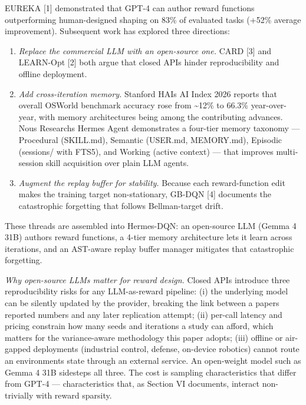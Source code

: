 \documentclass[conference,letterpaper,10pt]{IEEEtran}
\providecommand{\tightlist}{\setlength{\itemsep}{0pt}\setlength{\parskip}{0pt}}
\begin{document}
EUREKA {[}1{]} demonstrated that GPT-4 can author reward functions outperforming human-designed shaping on 83\% of evaluated tasks (+52\% average improvement). Subsequent work has explored three directions:

\begin{enumerate}
\def\labelenumi{\arabic{enumi}.}
\tightlist
\item
  \emph{Replace the commercial LLM with an open-source one.} CARD {[}3{]} and LEARN-Opt {[}2{]} both argue that closed APIs hinder reproducibility and offline deployment.
\item
  \emph{Add cross-iteration memory.} Stanford HAI\textquotesingle s AI Index 2026 reports that overall OSWorld benchmark accuracy rose from \textasciitilde12\% to 66.3\% year-over-year, with memory architectures being among the contributing advances. Nous Research\textquotesingle s Hermes Agent demonstrates a four-tier memory taxonomy --- Procedural (SKILL.md), Semantic (USER.md, MEMORY.md), Episodic (sessions/ with FTS5), and Working (active context) --- that improves multi-session skill acquisition over plain LLM agents.
\item
  \emph{Augment the replay buffer for stability.} Because each reward-function edit makes the training target non-stationary, GB-DQN {[}4{]} documents the catastrophic forgetting that follows Bellman-target drift.
\end{enumerate}

These threads are assembled into Hermes-DQN: an open-source LLM (Gemma 4 31B) authors reward functions, a 4-tier memory architecture lets it learn across iterations, and an AST-aware replay buffer manager mitigates that catastrophic forgetting.

\emph{Why open-source LLMs matter for reward design.} Closed APIs introduce three reproducibility risks for any LLM-as-reward pipeline: (i) the underlying model can be silently updated by the provider, breaking the link between a paper\textquotesingle s reported numbers and any later replication attempt; (ii) per-call latency and pricing constrain how many seeds and iterations a study can afford, which matters for the variance-aware methodology this paper adopts; (iii) offline or air-gapped deployments (industrial control, defense, on-device robotics) cannot route an environment\textquotesingle s state through an external service. An open-weight model such as Gemma 4 31B sidesteps all three. The cost is sampling characteristics that differ from GPT-4 --- characteristics that, as Section VI documents, interact non-trivially with reward sparsity.
\end{document}
